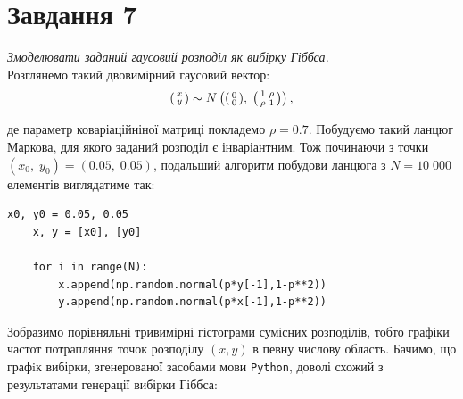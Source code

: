 \documentclass[a4paper,14pt]{extarticle} %
\numberwithin{equation}{section}
\begin{document}
\newpage
\section*{Завдання 7}

\textit{Змоделювати заданий гаусовий розподіл як вибірку Гіббса.} \\

Розглянемо такий двовимірний гаусовий вектор:
\begin{equation*}
    \begin{psmallmatrix}
        x \\
        y \\
    \end{psmallmatrix}
    \sim N
    \left(
        \begin{psmallmatrix}
            0 \\
            0 \\
        \end{psmallmatrix}
        ,\;
        \begin{psmallmatrix}
            1 & \rho  \\
            \rho & 1 \\
        \end{psmallmatrix}
    \right),
\end{equation*}

де параметр коваріаційніної матриці покладемо $\rho=0.7$. Побудуємо такий ланцюг Маркова, для якого заданий розподіл є інваріантним. Тож починаючи з точки $(x_0,\;y_0)=(0.05,\;0.05)$, подальший алгоритм побудови ланцюга з $N=10\;000$ елементів виглядатиме так:

\begin{lstlisting}[firstnumber=1, label = code: task 7, caption = Генерування вибірки Гіббса]
    x0, y0 = 0.05, 0.05
    x, y = [x0], [y0]
    
    for i in range(N):
        x.append(np.random.normal(p*y[-1],1-p**2))
        y.append(np.random.normal(p*x[-1],1-p**2))
\end{lstlisting}

\vspace{0.4cm}
Зобразимо порівняльні тривимірні гістограми сумісних розподілів, тобто графіки частот потрапляння точок розподілу $(x,y)$ в певну числову область. Бачимо, що графiк вибірки, згенерованої засобами мови \texttt{Python}, доволі схожий з результатами генерації вибірки Гіббса:
\end{document}

